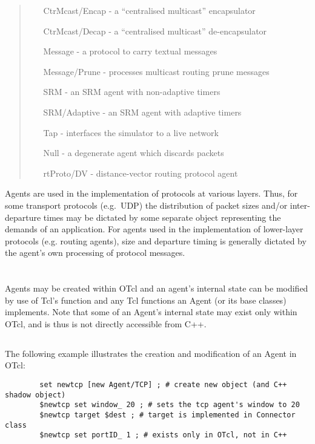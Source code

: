 \begin{quote}
\begin{itemize}
	\item[CtrMcast/Encap] - a ``centralised multicast'' encapsulator
	\item[CtrMcast/Decap] - a ``centralised multicast'' de-encapsulator
	\item[Message] - a protocol to carry textual messages
	\item[Message/Prune] - processes multicast routing prune messages

	\item[SRM] - an SRM agent with non-adaptive timers
	\item[SRM/Adaptive] - an SRM agent with adaptive timers

	\item[Tap] - interfaces the simulator to a live network

	\item[Null] - a degenerate agent which discards packets

	\item[rtProto/DV] - distance-vector routing protocol agent
\end{itemize}
\end{quote}
Agents are used in the implementation of protocols at various layers.
Thus, for some transport protocols (e.g.~UDP) the distribution
of packet sizes and/or inter-departure times
may be dictated by some separate
object representing the demands of an application.
For agents used in the implementation of lower-layer protocols
(e.g. routing agents), size and departure timing is generally dictated
by the agent's own processing of protocol messages.

\section{}

Agents may be created within OTcl and an agent's internal
state can be modified by use of Tcl's  function and
any Tcl functions an Agent (or its base classes) implements.
Note that some of an Agent's internal state may exist
only within OTcl, and is thus is not directly accessible from C++.

\subsection{}

The following example illustrates the creation and modification
of an Agent in OTcl:
\begin{small}
\begin{verbatim}
        set newtcp [new Agent/TCP] ; # create new object (and C++ shadow object)
        $newtcp set window_ 20 ; # sets the tcp agent's window to 20
        $newtcp target $dest ; # target is implemented in Connector class
        $newtcp set portID_ 1 ; # exists only in OTcl, not in C++
\end{verbatim}
\end{small}

